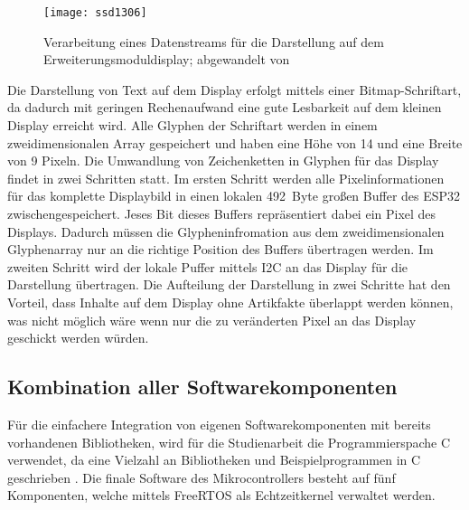 \begin{figure}[h]
    \centering
    \texttt{[image: ssd1306]}
    \caption{Verarbeitung eines Datenstreams für die Darstellung auf dem Erweiterungsmoduldisplay; abgewandelt von \cite[S.~37]{ssd1306}}
    \label{fig:ssd1306PixelControl}
\end{figure}

Die Darstellung von Text auf dem Display erfolgt mittels einer Bitmap-Schriftart, da dadurch mit geringen Rechenaufwand eine gute Lesbarkeit auf dem kleinen Display erreicht wird. Alle Glyphen der Schriftart werden in einem zweidimensionalen Array gespeichert und haben eine Höhe von 14 und eine Breite von 9 Pixeln. Die Umwandlung von Zeichenketten in Glyphen für das Display findet in zwei Schritten statt. Im ersten Schritt werden alle Pixelinformationen für das komplette Displaybild in einen lokalen 492~Byte großen Buffer des ESP32 zwischengespeichert. Jeses Bit dieses Buffers repräsentiert dabei ein Pixel des Displays. Dadurch müssen die Glypheninfromation aus dem zweidimensionalen Glyphenarray nur an die richtige Position des Buffers übertragen werden. Im zweiten Schritt wird der lokale Puffer mittels \ac{I2C} an das Display für die Darstellung übertragen. Die Aufteilung der Darstellung in zwei Schritte hat den Vorteil, dass Inhalte auf dem Display ohne Artikfakte überlappt werden können, was nicht möglich wäre wenn nur die zu veränderten Pixel an das Display geschickt werden würden.

\subsection{Kombination aller Softwarekomponenten}

Für die einfachere Integration von eigenen Softwarekomponenten mit bereits vorhandenen Bibliotheken, wird für die Studienarbeit die Programmierspache C verwendet, da eine Vielzahl an Bibliotheken und Beispielprogrammen in C geschrieben \cite{espressifIDF}. Die finale Software des Mikrocontrollers besteht auf fünf Komponenten, welche mittels FreeRTOS als Echtzeitkernel verwaltet werden. 

